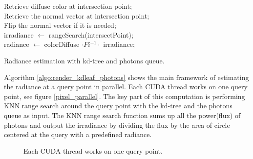 \begin{algorithm}
	\SetAlgoLined
	
	 {
		Retrieve diffuse color at intersection point; \\
		Retrieve the normal vector at intersection point; \\
		Flip the normal vector if it is needed; \\
		irradiance \(\leftarrow\) rangeSearch(intersectPoint); \\
		radiance \(\leftarrow\) colorDiffuse \( \cdot Pi^{-1} \cdot\) irradiance; \\ 	
	}
	\caption{Radiance estimation with kd-tree and photons queue.} 	
	\label{algo:render_kdleaf_photons}
\end{algorithm}

Algorithm \ref{algo:render_kdleaf_photons} shows the main framework of estimating the radiance at a query point in parallel. Each CUDA thread works on one query point, see figure \ref{pixel_parallel}. The key part of this computation is performing KNN range search around the query point with the kd-tree and the photons queue as input. The KNN range search function sums up all the power(flux) of photons and output the irradiance by dividing the flux by the area of circle centered at the query with a predefined radiance.

\begin{figure}
    \centering
    \renewcommand{\thefigure}{\thechapter.\arabic{figure}}
    \caption[Pixels and CUDA threads]{Each CUDA thread works on one query point.}
    \label{fig:pixel_parallel}
\end{figure}

